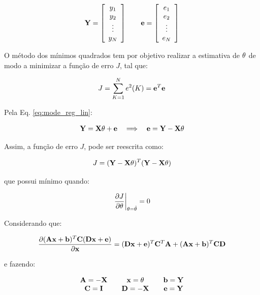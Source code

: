 \begin{equation*}
\mathbf{Y} = \left[
\begin{array}{c}
y_1\\
y_2\\
\vdots\\
y_N
\end{array}
\right] \qquad
\mathbf{e} = \left[
\begin{array}{c}
e_1\\
e_2\\
\vdots\\
e_N
\end{array}
\right]
\end{equation*}

O método dos mínimos quadrados tem por objetivo realizar a estimativa de
$\mathbf{\theta}$ de modo a minimizar a função de erro $J$, tal que:

\begin{equation}
J = \sum_{K = 1}^N e^2(K) = \mathbf{e}^T\mathbf{e}
\end{equation}

Pela Eq. \ref{eq:mode_reg_lin}:

\begin{equation}
\mathbf{Y} = \mathbf{X\theta} + \mathbf{e} \quad\Longrightarrow\quad \mathbf{e} = \mathbf{Y} - \mathbf{X\theta}
\end{equation}

Assim, a função de erro $J$, pode ser reescrita como:

\begin{equation}\label{eq:J}
J = (\mathbf{Y} - \mathbf{X\theta})^T(\mathbf{Y} - \mathbf{X\theta})
\end{equation}

\noindent que possui mínimo quando:

\begin{equation*}
\left.\frac{\partial J}{\partial \theta}\right|_{\theta = \hat{\mathbf{\theta}}} = 0
\end{equation*}

Considerando que:

\begin{equation*}
\frac{\partial (\mathbf{Ax} + \mathbf{b})^T\mathbf{C}(\mathbf{Dx} + \mathbf{e})}{\partial \mathbf{x}} =
(\mathbf{Dx} + \mathbf{e})^T\mathbf{C}^T\mathbf{A} + (\mathbf{Ax} + \mathbf{b})^T\mathbf{CD}
\end{equation*}

\noindent e fazendo:

\begin{equation*}
\begin{array}{c@{\qquad}c@{\qquad}c}
\mb{A} = -\mb{X} & \mb{x} = \mb{\theta} & \mb{b} = \mb{Y}\\
\mb{C} = \mb{I}  & \mb{D} = -\mb{X}     & \mb{e} = \mb{Y}
\end{array}
\end{equation*}

